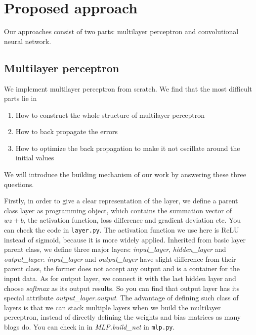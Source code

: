 \documentclass[11pt]{scrartcl}
\begin{document}
\section{Proposed approach}
Our approaches consist of two parts: multilayer perceptron and convolutional neural network.
\subsection{Multilayer perceptron}
We implement multilayer perceptron from scratch. We find that the most difficult parts lie in
\begin{enumerate}[(1)]
	\item How to construct the whole structure of multilayer perceptron
	\item How to back propagate the errors
	\item How to optimize the back propagation to make it not oscillate around the initial values
\end{enumerate}
We will introduce the building mechanism of our work by answering these three questions.

Firstly, in order to give a clear representation of the layer, we define a parent class layer as programming object, which contains the summation vector of $wz+b$, the activation function, loss difference and gradient deviation etc. You can check the code in \texttt{layer.py}. The activation function we use here is ReLU instead of sigmoid, because it is more widely applied. Inherited from basic layer parent class, we define three major layers: \textit{input\_layer}, \textit{hidden\_layer} and \textit{output\_layer}. \textit{input\_layer} and \textit{output\_layer} have slight difference from their parent class, the former does not accept any output and is a container for the input data. As for output layer, we connect it with the last hidden layer and choose \textit{softmax} as its output results. So you can find that output layer has its special attribute \textit{output\_layer.output}. The advantage of defining such class of layers is that we can stack multiple layers when we build the multilayer perceptron, instead of directly defining the weights and bias matrices as many blogs do. You can check in in \textit{MLP.build\_net} in \texttt{mlp.py}.
\end{document}
